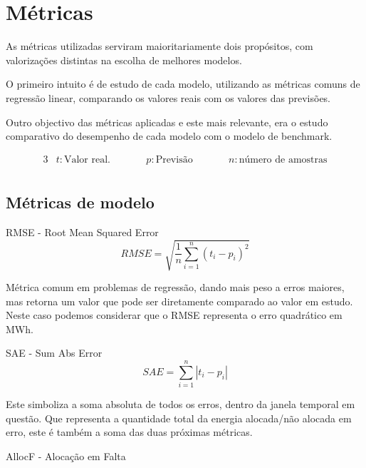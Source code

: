 \chapter{Métricas}

As métricas utilizadas serviram maioritariamente dois propósitos, com valorizações distintas na escolha de melhores modelos.\par
O primeiro intuito é de estudo de cada modelo, utilizando as métricas comuns de regressão linear, comparando os valores reais com os valores das previsões.\par
Outro objectivo das métricas aplicadas e este mais relevante, era o estudo comparativo do desempenho de cada modelo com o modelo de benchmark.\par

\begin{alignat*}{3} 
& t : \text{Valor real.} &\qquad& p : \text{Previsão} &\qquad& n : \text{número de amostras} \\
\end{alignat*}


\section{Métricas de modelo}

\bigskip
RMSE - Root Mean Squared Error \\

\begin{equation} \label{eq:rmse} 
    RMSE = \sqrt{\frac{1}{n} \sum_{i=1}^{n}(t_i - p_i)^2} 
\end{equation}
\smallskip

Métrica comum em problemas de regressão, dando mais peso a erros maiores, mas retorna um valor que pode ser diretamente comparado ao valor em estudo. Neste caso podemos considerar que o RMSE representa o erro quadrático em MWh.\par
\bigskip
SAE - Sum Abs Error \\


\begin{equation} \label{eq:sae} 
    SAE = \sum_{i=1}^{n}\left|t_i - p_i \right|
\end{equation}
\smallskip

Este simboliza a soma absoluta de todos os erros, dentro da janela temporal em questão. Que representa a quantidade total da energia alocada/não alocada em erro, este é também a soma das duas próximas métricas.\par
\bigskip
AllocF - Alocação em Falta \\

